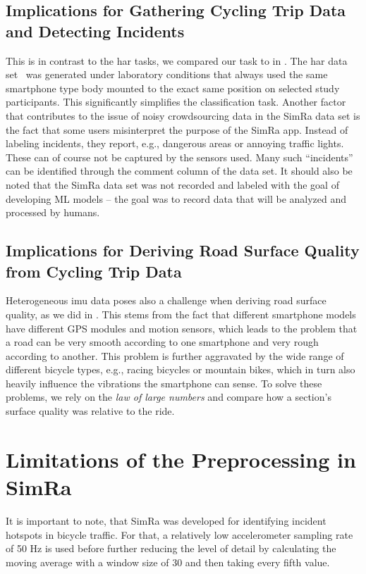 \subsection*{Implications for Gathering Cycling Trip Data and Detecting Incidents}
This is in contrast to the \ac{har} tasks, we compared our task to in .
The \ac{har} data set~\cite{anguita2013public} was generated under laboratory conditions that always used the same smartphone type body mounted to the exact same position on selected study participants.
This significantly simplifies the classification task.
Another factor that contributes to the issue of noisy crowdsourcing data in the SimRa data set is the fact that some users misinterpret the purpose of the SimRa app.
Instead of labeling incidents, they report, e.g., dangerous areas or annoying traffic lights.
These can of course not be captured by the sensors used.
Many such ``incidents'' can be identified through the comment column of the data set.
It should also be noted that the SimRa data set was not recorded and labeled with the goal of developing ML models -- the goal was to record data that will be analyzed and processed by humans.

\subsection*{Implications for Deriving Road Surface Quality from Cycling Trip Data}
Heterogeneous \ac{imu} data poses also a challenge when deriving road surface quality, as we did in .
This stems from the fact that different smartphone models have different GPS modules and motion sensors, which leads to the problem that a road can be very smooth according to one smartphone and very rough according to another.
This problem is further aggravated by the wide range of different bicycle types, e.g., racing bicycles or mountain bikes, which in turn also heavily influence the vibrations the smartphone can sense.
To solve these problems, we rely on the \textit{law of large numbers} and compare how a section's surface quality was relative to the ride. 

\section{Limitations of the Preprocessing in SimRa}
It is important to note, that SimRa was developed for identifying incident hotspots in bicycle traffic.
For that, a relatively low accelerometer sampling rate of 50 Hz is used before further reducing the level of detail by calculating the moving average with a window size of 30 and then taking every fifth value.

